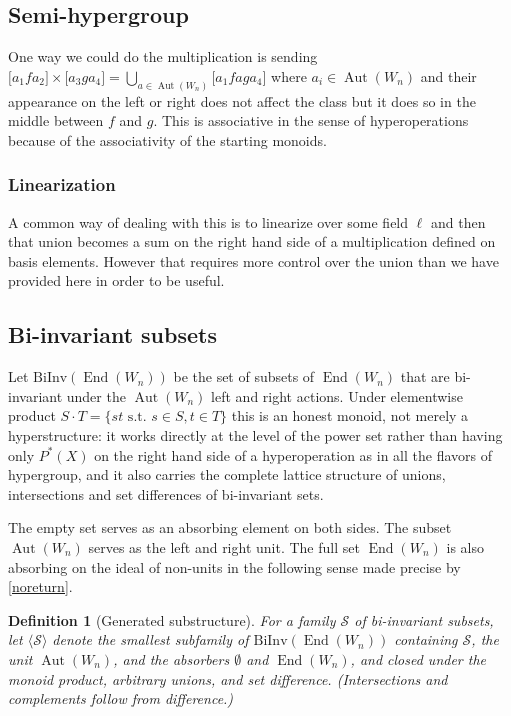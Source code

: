 \documentclass[11pt]{article}
\theoremstyle{change}
\newtheorem{definition}[equation]{Definition}
\theoremstyle{nonumberplain}
\numberwithin{equation}{section}
\newcommand\st{{\textrm{ s.t.\ }}}
\newcommand\setof[1]{\{ #1 \}}
\DeclareMathOperator{\End}{End}
\DeclareMathOperator{\Aut}{Aut}
\begin{document}
\subsection{Semi-hypergroup}

One way we could do the multiplication is sending $\big[a_1 f a_2 \big] \times \big[a_3 g a_4 \big] = \underset{a \in \Aut (W_n)}{\bigcup} \big[ a_1 f a g a_4 \big]$ where $a_i \in \Aut (W_n)$ and their appearance on the left or right does not affect the class but it does so in the middle between $f$ and $g$. This is associative in the sense of hyperoperations because of the associativity of the starting monoids.

\subsubsection{Linearization}

A common way of dealing with this is to linearize over some field $\ell$ and then that union becomes a sum on the right hand side of a multiplication defined on basis elements. However that requires more control over the union than we have provided here in order to be useful.

\subsection{Bi-invariant subsets}

Let $\text{BiInv}(\End(W_n))$ be the set of subsets of $\End(W_n)$ that are bi-invariant under the $\Aut (W_n)$ left and right actions. Under elementwise product $S \cdot T = \setof{st \st s \in S, t \in T}$ this is an honest monoid, not merely a hyperstructure: it works directly at the level of the power set rather than having only $P^* (X)$ on the right hand side of a hyperoperation as in all the flavors of hypergroup, and it also carries the complete lattice structure of unions, intersections and set differences of bi-invariant sets.

The empty set serves as an absorbing element on both sides. The subset $\Aut (W_n)$ serves as the left and right unit. The full set $\End (W_n)$ is also absorbing on the ideal of non-units in the following sense made precise by \cref{noreturn}.

\begin{definition}[Generated substructure\label{generated}]
For a family $\mathcal{S}$ of bi-invariant subsets, let $\langle \mathcal{S} \rangle$ denote the smallest subfamily of $\text{BiInv}(\End(W_n))$ containing $\mathcal{S}$, the unit $\Aut(W_n)$, and the absorbers $\emptyset$ and $\End(W_n)$, and closed under the monoid product, arbitrary unions, and set difference. (Intersections and complements follow from difference.)
\end{definition}
\end{document}
